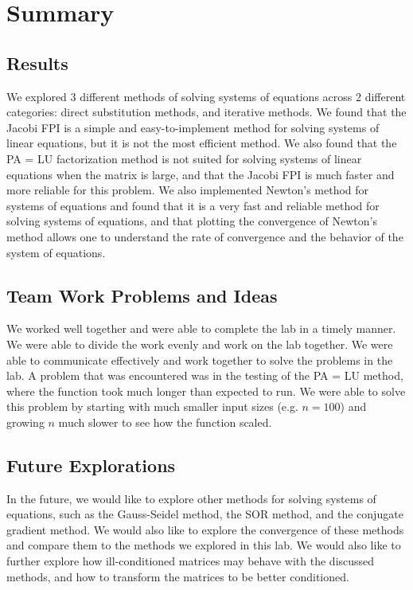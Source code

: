 \documentclass[11pt]{article}
\begin{document}
\section{Summary}

\subsection{Results}

We explored 3 different methods of solving systems of equations across 2 different categories: direct substitution methods, and iterative methods. We found that the Jacobi FPI is a simple and easy-to-implement method for solving systems of linear equations, but it is not the most efficient method. We also found that the PA = LU factorization method is not suited for solving systems of linear equations when the matrix is large, and that the Jacobi FPI is much faster and more reliable for this problem. We also implemented Newton's method for systems of equations and found that it is a very fast and reliable method for solving systems of equations, and that plotting the convergence of Newton's method allows one to understand the rate of convergence and the behavior of the system of equations.

\subsection{Team Work Problems and Ideas}

We worked well together and were able to complete the lab in a timely manner. We were able to divide the work evenly and work on the lab together. We were able to communicate effectively and work together to solve the problems in the lab. A problem that was encountered was in the testing of the PA = LU method, where the function took much longer than expected to run. We were able to solve this problem by starting with much smaller input sizes (e.g. $n = 100$) and growing $n$ much slower to see how the function scaled.
\subsection{Future Explorations}

In the future, we would like to explore other methods for solving systems of equations, such as the Gauss-Seidel method, the SOR method, and the conjugate gradient method. We would also like to explore the convergence of these methods and compare them to the methods we explored in this lab. We would also like to further explore how ill-conditioned matrices may behave with the discussed methods, and how to transform the matrices to be better conditioned.
\end{document}
